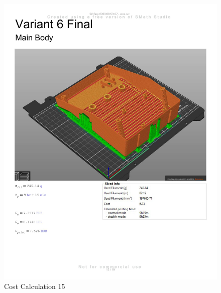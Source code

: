 \begin{figure}[H]
    \centering
    \includegraphics[width=\linewidth]{texs/appendix/data/costcalculation/cost1-15.jpg}
    \caption{Cost Calculation 15}
    \label{fig:cost-calculation-15}
\end{figure}

